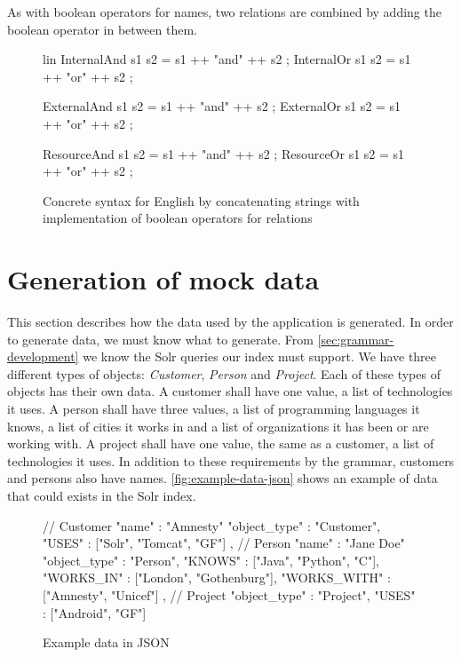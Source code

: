 As with boolean operators for names, two relations are combined by adding the boolean operator in between them.

\begin{figure}[H]
\begin{code}
lin
 InternalAnd s1 s2 = s1 ++ "and" ++ s2 ;
 InternalOr s1 s2 = s1 ++ "or" ++ s2 ;

 ExternalAnd s1 s2 = s1 ++ "and" ++ s2 ;
 ExternalOr s1 s2 = s1 ++ "or" ++ s2 ;

 ResourceAnd s1 s2 = s1 ++ "and" ++ s2 ;
 ResourceOr s1 s2 = s1 ++ "or" ++ s2 ; 
\end{code}
\caption{Concrete syntax for English by concatenating strings with implementation of boolean operators for relations\label{fig:concat-english-boolean-relations}}
\end{figure}

\section{Generation of mock data}
This section describes how the data used by the application is generated. In order to generate data, we must know what to generate. From \autoref{sec:grammar-development} we know the Solr queries our index must support. We have three different types of objects: \emph{Customer}, \emph{Person} and \emph{Project}. Each of these types of objects has their own data. A customer shall have one value, a list of technologies it uses. A person shall have three values, a list of programming languages it knows, a list of cities it works in and a list of organizations it has been or are working with. A project shall have one value, the same as a customer, a list of technologies it uses. In addition to these requirements by the grammar, customers and persons also have names. \autoref{fig:example-data-json} shows an example of data that could exists in the Solr index.

\begin{figure}[H]
\begin{js-code}
{ // Customer
  "name" : "Amnesty"
  "object_type" : "Customer",
  "USES" : ["Solr", "Tomcat", "GF"]
},
{ // Person
  "name" : "Jane Doe"
  "object_type" : "Person",
  "KNOWS" : ["Java", "Python", "C"],
  "WORKS_IN" : ["London", "Gothenburg"],
  "WORKS_WITH" :  ["Amnesty", "Unicef"]
},
{ // Project
  "object_type" : "Project",
  "USES" : ["Android", "GF"]
}
\end{js-code}
\caption{Example data in JSON\label{fig:example-data-json}}
\end{figure}


